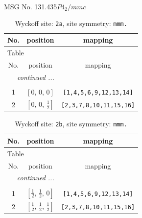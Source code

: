 \documentclass[fleqn,8pt]{jsarticle}
\begin{document}
\setcounter{MaxMatrixCols}{32}

\renewcommand{\tablename}{Table~}
\renewcommand{\figurename}{Figure~}
\begin{center}
\LARGE
MSG No. 131.435\quad$P4_{2}/mmc$
\end{center}
\renewcommand{\arraystretch}{1.2}
\begin{longtable}{ccc}
\caption{Wyckoff site: {\tt 2a}, site symmetry: {\tt mmm.}}
 \\
 \hline \hline
No. & position & mapping \\ \hline \endfirsthead

\multicolumn{2}{l}{\tablename\ \thetable{}} \\
 \hline \hline
No. & position & mapping \\ \hline \endhead

 \hline \hline
\multicolumn{2}{r}{\footnotesize\it continued ...} \\ \endfoot

 \hline \hline
\multicolumn{2}{r}{} \\ \endlastfoot

1 & $\left[ 0,\, 0,\, 0 \right]$ & {\tt [1,4,5,6,9,12,13,14]} \\ \hline
2 & $\left[ 0,\, 0,\, \frac{1}{2} \right]$ & {\tt [2,3,7,8,10,11,15,16]} \\
\end{longtable}
\renewcommand{\arraystretch}{1.2}
\begin{longtable}{ccc}
\caption{Wyckoff site: {\tt 2b}, site symmetry: {\tt mmm.}}
 \\
 \hline \hline
No. & position & mapping \\ \hline \endfirsthead

\multicolumn{2}{l}{\tablename\ \thetable{}} \\
 \hline \hline
No. & position & mapping \\ \hline \endhead

 \hline \hline
\multicolumn{2}{r}{\footnotesize\it continued ...} \\ \endfoot

 \hline \hline
\multicolumn{2}{r}{} \\ \endlastfoot

1 & $\left[ \frac{1}{2},\, \frac{1}{2},\, 0 \right]$ & {\tt [1,4,5,6,9,12,13,14]} \\ \hline
2 & $\left[ \frac{1}{2},\, \frac{1}{2},\, \frac{1}{2} \right]$ & {\tt [2,3,7,8,10,11,15,16]} \\
\end{longtable}
\end{document}
